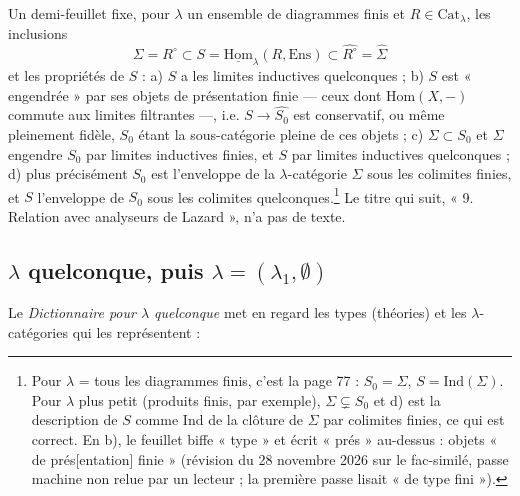 \documentclass[11pt,a4paper]{article}
\begin{document}
Un demi-feuillet fixe, pour $\lambda$ un ensemble de diagrammes finis et
$R \in \mathrm{Cat}_{\lambda}$, les inclusions
\[
\Sigma = R^{\circ} \subset S = \underline{\mathrm{Hom}}_{\lambda}(R, \mathrm{Ens})
\subset \widehat{R^{\circ}} = \widehat{\Sigma}
\]
et les propriétés de $S$ : a) $S$ a les limites inductives quelconques ;
b) $S$ est « engendrée » par ses objets de présentation finie — ceux dont
$\mathrm{Hom}(X, -)$ commute aux limites filtrantes —, i.e. $S \to
\widehat{S_{0}}$ est conservatif, ou même pleinement fidèle, $S_{0}$ étant
la sous-catégorie pleine de ces objets ; c) $\Sigma \subset S_{0}$ et $\Sigma$
engendre $S_{0}$ par limites inductives finies, et $S$ par limites
inductives quelconques ; d) plus précisément $S_{0}$ est l'enveloppe de la
$\lambda$-catégorie $\Sigma$ sous les colimites finies, et $S$ l'enveloppe
de $S_{0}$ sous les colimites quelconques.\footnote{Pour $\lambda$ = tous
les diagrammes finis, c'est la page 77 : $S_{0} = \Sigma$, $S = \mathrm{Ind}
(\Sigma)$. Pour $\lambda$ plus petit (produits finis, par exemple),
$\Sigma \subsetneq S_{0}$ et d) est la description de $S$ comme
$\mathrm{Ind}$ de la clôture de $\Sigma$ par colimites finies, ce qui est
correct. En b), le feuillet biffe « type » et écrit « prés » au-dessus :
objets « de prés[entation] finie » (révision du 28 novembre 2026 sur le fac-similé, passe machine non relue par un lecteur ;
la première passe lisait « de type fini »).} Le
titre qui suit, « 9. Relation avec analyseurs de Lazard », n'a pas de
texte.

\subsection*{$\lambda$ quelconque, puis $\lambda = (\lambda_{1}, \emptyset)$}

Le \emph{Dictionnaire pour $\lambda$ quelconque} met en regard les types
(théories) et les $\lambda$-catégories qui les représentent :
\end{document}
